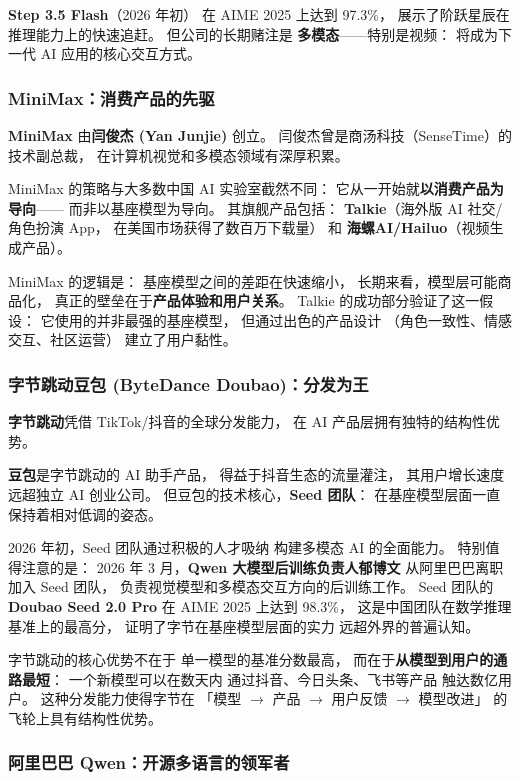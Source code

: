 \textbf{Step 3.5 Flash}（2026 年初）
在 AIME 2025 上达到 97.3\%，
展示了阶跃星辰在推理能力上的快速追赶。
但公司的长期赌注是
\textbf{多模态}——特别是视频：
将成为下一代 AI 应用的核心交互方式。

\subsubsection{MiniMax：消费产品的先驱}

\textbf{MiniMax} 由\textbf{闫俊杰 (Yan Junjie)} 创立。
闫俊杰曾是商汤科技（SenseTime）的技术副总裁，
在计算机视觉和多模态领域有深厚积累。

MiniMax 的策略与大多数中国 AI 实验室截然不同：
它从一开始就\textbf{以消费产品为导向}——
而非以基座模型为导向。
其旗舰产品包括：
\textbf{Talkie}（海外版 AI 社交/角色扮演 App，
在美国市场获得了数百万下载量）
和 \textbf{海螺AI/Hailuo}（视频生成产品）。

MiniMax 的逻辑是：
基座模型之间的差距在快速缩小，
长期来看，模型层可能商品化，
真正的壁垒在于\textbf{产品体验和用户关系}。
Talkie 的成功部分验证了这一假设：
它使用的并非最强的基座模型，
但通过出色的产品设计
（角色一致性、情感交互、社区运营）
建立了用户黏性。

\subsubsection{字节跳动豆包 (ByteDance Doubao)：分发为王}

\textbf{字节跳动}凭借 TikTok/抖音的全球分发能力，
在 AI 产品层拥有独特的结构性优势。

\textbf{豆包}是字节跳动的 AI 助手产品，
得益于抖音生态的流量灌注，
其用户增长速度远超独立 AI 创业公司。
但豆包的技术核心，\textbf{Seed 团队}：
在基座模型层面一直保持着相对低调的姿态。

2026 年初，Seed 团队通过积极的人才吸纳
构建多模态 AI 的全面能力。
特别值得注意的是：
2026 年 3 月，\textbf{Qwen 大模型后训练负责人郁博文}
从阿里巴巴离职加入 Seed 团队，
负责视觉模型和多模态交互方向的后训练工作。
Seed 团队的 \textbf{Doubao Seed 2.0 Pro}
在 AIME 2025 上达到 98.3\%，
这是中国团队在数学推理基准上的最高分，
证明了字节在基座模型层面的实力
远超外界的普遍认知。

字节跳动的核心优势不在于
单一模型的基准分数最高，
而在于\textbf{从模型到用户的通路最短}：
一个新模型可以在数天内
通过抖音、今日头条、飞书等产品
触达数亿用户。
这种分发能力使得字节在
「模型 $\to$ 产品 $\to$ 用户反馈 $\to$ 模型改进」
的飞轮上具有结构性优势。

\subsubsection{阿里巴巴 Qwen：开源多语言的领军者}

